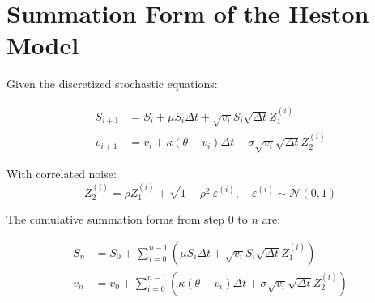 
\section*{Summation Form of the Heston Model}

Given the discretized stochastic equations:

\begin{align*}
	S_{i+1} &= S_i + \mu S_i \Delta t + \sqrt{v_i} S_i \sqrt{\Delta t} Z_1^{(i)} \\
	v_{i+1} &= v_i + \kappa (\theta - v_i) \Delta t + \sigma \sqrt{v_i} \sqrt{\Delta t} Z_2^{(i)}
\end{align*}

With correlated noise:
\[
Z_2^{(i)} = \rho Z_1^{(i)} + \sqrt{1 - \rho^2} \, \varepsilon^{(i)}, \quad \varepsilon^{(i)} \sim \mathcal{N}(0,1)
\]

The cumulative summation forms from step \( 0 \) to \( n \) are:

\begin{align*}
	S_n &= S_0 + \sum_{i=0}^{n-1} \left( \mu S_i \Delta t + \sqrt{v_i} S_i \sqrt{\Delta t} Z_1^{(i)} \right) \\
	v_n &= v_0 + \sum_{i=0}^{n-1} \left( \kappa (\theta - v_i) \Delta t + \sigma \sqrt{v_i} \sqrt{\Delta t} Z_2^{(i)} \right)
\end{align*}